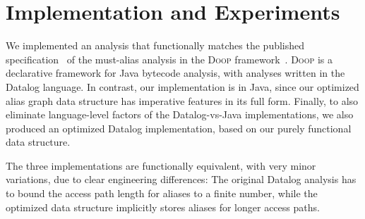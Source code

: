 



\section{Implementation and Experiments}
\label{sec:experiments}

We implemented an analysis that functionally matches the published
specification~\cite{soap/Balatsouras17} of the must-alias analysis in the
\textsc{Doop} framework~\cite{oopsla/BravenboerS09}. \textsc{Doop} is
a declarative framework for Java bytecode analysis, with analyses
written in the Datalog language. In contrast, our implementation is in
Java, since our optimized alias graph data structure has imperative
features in its full form. Finally, to also eliminate language-level
factors of the Datalog-vs-Java implementations, we also produced an
optimized Datalog implementation, based on our purely functional data
structure.

The three
implementations are functionally equivalent, with very minor
variations, due to clear engineering differences: The
original Datalog analysis has to bound the access path length for aliases to a
finite number, while the optimized data structure implicitly stores
aliases for longer access paths.

